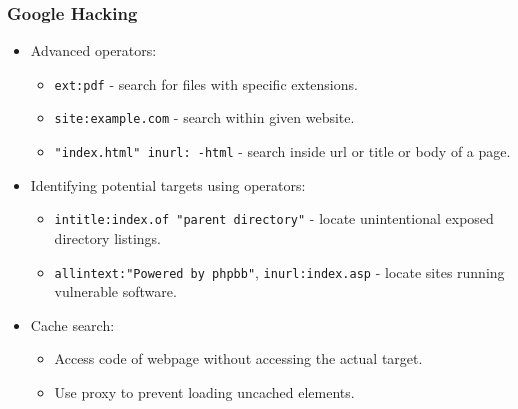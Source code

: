 \documentclass[11pt]{article}
\begin{document}
\subsubsection{Google Hacking}
\begin{itemize}
  \item Advanced operators:
    \begin{itemize}
      \item \texttt{ext:pdf} - search for files with specific extensions.
      \item \texttt{site:example.com} - search within given website.
      \item \texttt{"index.html" inurl: -html} - search inside url or title or body of a page.
    \end{itemize}
  \item Identifying potential targets using operators:
    \begin{itemize}
      \item \texttt{intitle:index.of "parent directory"} - locate unintentional exposed directory listings.
      \item \texttt{allintext:"Powered by phpbb"}, \texttt{inurl:index.asp} - locate sites  running vulnerable software.
    \end{itemize}
  \item Cache search:
    \begin{itemize}
      \item Access code of webpage without accessing the actual target.
      \item Use proxy to prevent loading uncached elements.
    \end{itemize}
\end{itemize}
\end{document}
